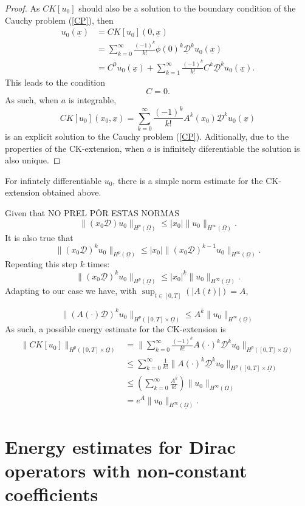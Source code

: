 \documentclass[12pt]{amsart}
\newcommand{\D}{\mathcal{D}}
\newcommand{\norm}[1]{|#1|}
\newcommand{\dnorm}[2]{\|#1\|_{#2}}
\newcommand{\hnorm}[2]{\dnorm{#1}{H^{#2}(\un\Omega)}}
\theoremstyle{definition}
\newcommand{\un}{\underline}
\begin{document}
\begin{proof}
As $CK[u_0]$ should also be a solution to the boundary condition of the Cauchy problem (\ref{CP}), then
\begin{align*}
    u_0(\un x) 
    &= CK[u_0](0, \un x)\\
    &=\sum_{k = 0}^\infty \frac{(-1)^k}{k!}\phi(0)^k\un{\D}^ku_0(\un{x})\\
    &= C^0u_0(\un{x})+ \sum_{k = 1}^\infty \frac{(-1)^k}{k!}C^k\un{\D}^ku_0(\un{x}).
\end{align*}
This leads to the condition %
\[
C = 0.
\]
As such, when $a$ is integrable, %
\[
CK[u_0](x_0, \un{x}) = \sum_{k = 0}^\infty \frac{(-1)^k}{k!}A^k(x_0)\un{\D}^ku_0(\un{x})
\]
is an explicit solution to the Cauchy problem (\ref{CP}). Aditionally, due to the properties of the CK-extension, when $a$ is infinitely diferentiable the solution is also unique. 
\end{proof}
For infintely differentiable $u_0$, there is a simple norm estimate for the CK-extension obtained above.

Given that  NO PREL PÔR ESTAS NORMAS
\[
\hnorm{(x_0\un{\D})u_0}{p} \leq \norm{x_0}\hnorm{u_0}{\infty}. 
\]
It is also true that
\[
\hnorm{(x_0\un{\D})^ku_0}{p} \leq \norm{x_0}\hnorm{(x_0\un{\D})^{k-1}u_0}{\infty}. 
\]
Repeating this step $k$ times:
\[
\hnorm{(x_0\un{\D})^ku_0}{p} \leq \norm{x_0}^k \hnorm{u_0}{\infty}. 
\]
Adapting to our case we have, with $\sup_{t \in [0, T]} (\norm{A(t)}) = A$,

\[
\|(A(\cdot)\un{\D} )^k u_0\|_{H^p([0,T]\times \un \Omega)}  \leq A^k \hnorm{u_0}{\infty}
\]
As such, a possible energy estimate for the CK-extension is 
\begin{align*}
\| CK[u_0]\|_{H^p([0,T]\times \un \Omega)}    &= \| \sum_{k = 0}^\infty \frac{(-1)^k}{k!}A(\cdot)^k\un{\D}^ku_0\|_{H^p([0,T]\times \un \Omega)} \\
        &\leq \sum_{k = 0}^\infty \frac{1}{k!}\|A(\cdot)^k\un{\D}^ku_0\|_{H^p([0,T]\times \un \Omega)} \\
        &\leq  \left( \sum_{k = 0}^\infty \frac{A^k}{k!} \right) \hnorm{u_0}{\infty}\\
        &= e^{A}\hnorm{u_0}{\infty}.
\end{align*}
\section{Energy estimates for Dirac operators with non-constant coefficients}
\end{document}
